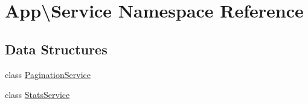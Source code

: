 \hypertarget{namespace_app_1_1_service}{}\section{App\textbackslash{}Service Namespace Reference}
\label{namespace_app_1_1_service}
\subsection*{Data Structures}
\begin{DoxyCompactItemize}
\item 
class \mbox{\hyperlink{class_app_1_1_service_1_1_pagination_service}{Pagination\+Service}}
\item 
class \mbox{\hyperlink{class_app_1_1_service_1_1_stats_service}{Stats\+Service}}
\end{DoxyCompactItemize}
